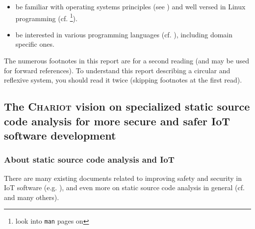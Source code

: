 \begin{itemize}
\item be familiar with operating systems principles
  (see \cite{Tanenbaum:92:OS,ArpaciDusseau14-Book}) and well
  versed in Linux programming
  (cf. \cite{Mitchell:2001:ALP,Kerrisk:2010:LinuxProgramming} \footnote{look
    into \texttt{man} pages on
    }).

  \item be interested in various programming languages
    (cf. \cite{Abelson1996:SICP,Scott:2007:PLP,Queinnec:1996:LSP}),
    including domain specific ones.

\end{itemize}



The numerous footnotes in this report are for a second reading (and
may be used for forward references). To understand this report
describing a circular and reflexive system, you should read it twice
(skipping footnotes at the first read).

\bigskip

\subsection{The \textsc{Chariot} vision on specialized static source code analysis for more secure and safer IoT software development}

\subsubsection{About static source code analysis and IoT}

There are many existing documents related to improving safety and
security in IoT software (e.g. \cite{Chen:2011:DAS, Medwed:2016:ISC}),
and even more on static source code analysis in general
(cf. \cite{Gomes2009AnOO, GosevaPopstojanova2015OnTC,
  Binkley:2007:SCA} and many others). %

